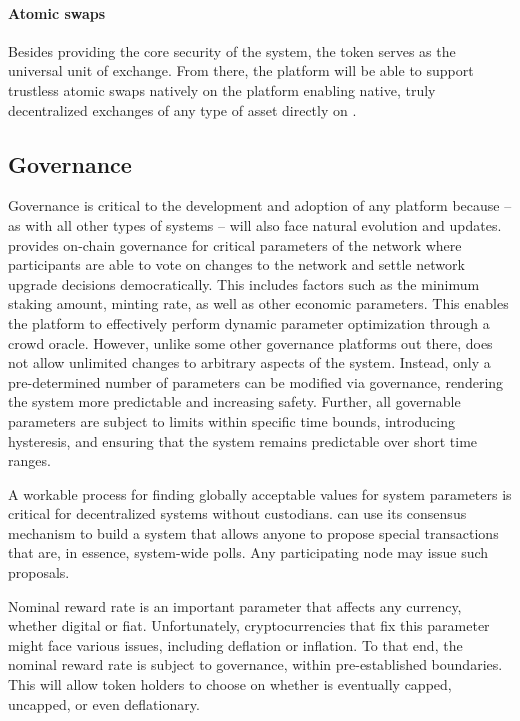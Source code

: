 \documentclass[runningheads]{llncs}
\begin{document}
\paragraph{Atomic swaps}
Besides providing the core security of the system, the \AVATokenName{} token serves as the universal unit of exchange. From there, the \AVAPlatformName{} platform will be able to support trustless atomic swaps natively on the platform enabling native, truly decentralized exchanges of any type of asset directly on \AVAPlatformName{}. 

\subsection{Governance}
Governance is critical to the development and adoption of any platform because – as with all other types of systems – \AVAPlatformName{} will also face natural evolution and updates. \AVATokenName{} provides on-chain governance for critical parameters of the network where participants are able to vote on changes to the network and settle network upgrade decisions democratically. This includes factors such as the minimum staking amount, minting rate, as well as other economic parameters. This enables the platform to effectively perform dynamic parameter optimization through a crowd oracle. However, unlike some other governance platforms out there, \AVAPlatformName{} does not allow unlimited changes to arbitrary aspects of the system. Instead, only a pre-determined number of parameters can be modified via governance, rendering the system more predictable and increasing safety. Further, all governable parameters are subject to limits within specific time bounds, introducing hysteresis, and ensuring that the system remains predictable over short time ranges. 


A workable process for finding globally acceptable values for system parameters is critical for decentralized systems without custodians. 
\AVAPlatformName{} can use its consensus mechanism to build a system that allows anyone to propose special transactions that are, in essence, system-wide polls. 
Any participating node may issue such proposals. 

Nominal reward rate is an important parameter that affects any currency, whether digital or fiat. 
Unfortunately, cryptocurrencies that fix this parameter might face various issues, including deflation or inflation.
To that end, the nominal reward rate is subject to governance, within pre-established boundaries. This will allow token holders to choose on whether \AVATokenName{} is eventually capped, uncapped, or even deflationary. 
\end{document}
